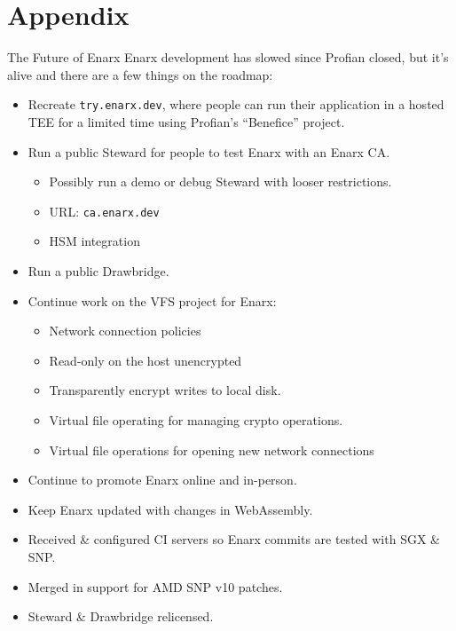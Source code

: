 \documentclass[graphics]{beamer}
\newcommand*\tick{\item[\Checkmark]}
\newcommand{\backupend}{
   \addtocounter{framenumberappendix}{-\value{framenumber}}
   \addtocounter{framenumber}{\value{framenumberappendix}} 
}
\begin{document}
\section{Appendix}
\begin{frame}{The Future of Enarx}
    Enarx development has slowed since Profian closed, but it's alive and there are a few things on the roadmap:
     {
        \begin{itemize}
            \item Recreate \texttt{try.enarx.dev}, where people can run their application in a hosted TEE for a limited time using Profian's ``Benefice'' project.
            \item Run a public Steward for people to test Enarx with an Enarx CA.
            \begin{itemize}
                \item Possibly run a demo or debug Steward with looser restrictions.
                \item URL: \texttt{ca.enarx.dev}
                \item HSM integration
            \end{itemize}
            \item Run a public Drawbridge.
            \item Continue work on the VFS project for Enarx:
            \begin{itemize}
                \item Network connection policies
                \item Read-only on the host unencrypted
                \item Transparently encrypt writes to local disk.
                \item Virtual file operating for managing crypto operations.
                \item Virtual file operations for opening new network connections
            \end{itemize}
            \item Continue to promote Enarx online and in-person.
            \item Keep Enarx updated with changes in WebAssembly.
        \end{itemize}
    }
     {
        \begin{itemize}
            \tick Received \& configured CI servers so Enarx commits are tested with SGX \& SNP.
            \tick Merged in support for AMD SNP v10 patches.
            \tick Steward \& Drawbridge relicensed.
        \end{itemize}
    }
\end{frame}
\backupend
\end{document}
